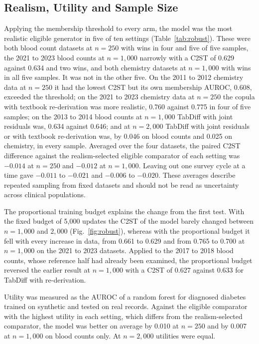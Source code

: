 \documentclass[conference]{IEEEtran}
\begin{document}
\subsection{Realism, Utility and Sample Size}

Applying the membership threshold to every arm, the model was the most realistic eligible generator in five of ten settings (Table~\ref{tab:robust}). These were both blood count datasets at $n = 250$ with wins in four and five of five samples, the 2021 to 2023 blood counts at $n = 1{,}000$ narrowly with a C2ST of 0.629 against 0.634 and two wins, and both chemistry datasets at $n = 1{,}000$ with wins in all five samples. It was not in the other five. On the 2011 to 2012 chemistry data at $n = 250$ it had the lowest C2ST but its own membership AUROC, 0.608, exceeded the threshold; on the 2021 to 2023 chemistry data at $n = 250$ the copula with textbook re-derivation was more realistic, 0.760 against 0.775 in four of five samples; on the 2013 to 2014 blood counts at $n = 1{,}000$ TabDiff with joint residuals was, 0.634 against 0.646; and at $n = 2{,}000$ TabDiff with joint residuals or with textbook re-derivation was, by 0.046 on blood counts and 0.025 on chemistry, in every sample. Averaged over the four datasets, the paired C2ST difference against the realism-selected eligible comparator of each setting was $-0.014$ at $n = 250$ and $-0.012$ at $n = 1{,}000$. Leaving out one survey cycle at a time gave $-0.011$ to $-0.021$ and $-0.006$ to $-0.020$. These averages describe repeated sampling from fixed datasets and should not be read as uncertainty across clinical populations.

The proportional training budget explains the change from the first test. With the fixed budget of 5,000 updates the C2ST of the model barely changed between $n = 1{,}000$ and $2{,}000$ (Fig.~\ref{fig:robust}), whereas with the proportional budget it fell with every increase in data, from 0.661 to 0.629 and from 0.765 to 0.700 at $n = 1{,}000$ on the 2021 to 2023 datasets. Applied to the 2017 to 2018 blood counts, whose reference half had already been examined, the proportional budget reversed the earlier result at $n = 1{,}000$ with a C2ST of 0.627 against 0.633 for TabDiff with re-derivation.

Utility was measured as the AUROC of a random forest for diagnosed diabetes trained on synthetic and tested on real records. Against the eligible comparator with the highest utility in each setting, which differs from the realism-selected comparator, the model was better on average by 0.010 at $n = 250$ and by 0.007 at $n = 1{,}000$ on blood counts only. At $n = 2{,}000$ utilities were equal.
\end{document}
